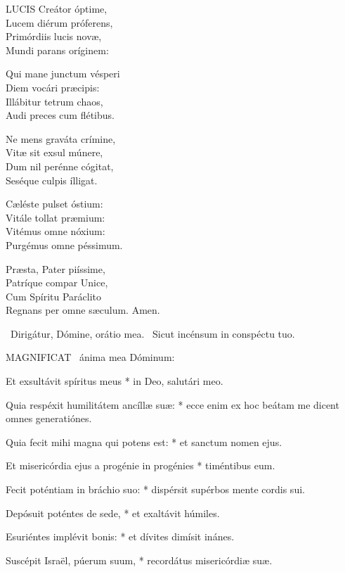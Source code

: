 
\lettrine[lines=2]{L}{UCIS} Creátor óptime,\\
Lucem diérum próferens,\\
Primórdiis lucis novæ,\\
Mundi parans oríginem:

Qui mane junctum vésperi\\
Diem vocári præcipis:\\
Illábitur tetrum chaos,\\
Audi preces cum flétibus.

Ne mens graváta crímine,\\
Vitæ sit exsul múnere,\\
Dum nil perénne cógitat,\\
Seséque culpis ílligat.

Cæléste pulset óstium:\\
Vitále tollat præmium:\\
Vitémus omne nóxium:\\
Purgémus omne péssimum.

Præsta, Pater piíssime,\\
Patríque compar Unice,\\
Cum Spíritu Paráclito\\
Regnans per omne sæculum. Amen.

\V\ Dirigátur, Dómine, orátio mea. \R\ Sicut incénsum in conspéctu tuo.



\lettrine[lines=2]{M}{AGNIFICAT} \textdagger\ ánima mea Dóminum:

Et exsultávit spíritus meus * in Deo, salutári meo.

Quia respéxit humilitátem ancíllæ suæ: * ecce enim ex hoc beátam me dicent omnes generatiónes.

Quia fecit mihi magna qui potens est: * et sanctum nomen ejus.

Et misericórdia ejus a progénie in progénies * timéntibus eum.

Fecit poténtiam in bráchio suo: * dispérsit supérbos mente cordis sui.

Depósuit poténtes de sede, * et exaltávit húmiles.

Esuriéntes implévit bonis: * et dívites dimísit inánes.

Suscépit Israël, púerum suum, * recordátus misericórdiæ suæ.

